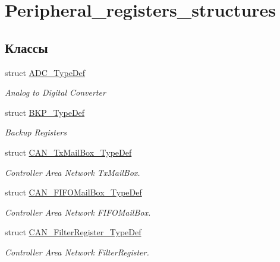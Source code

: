 \hypertarget{group___peripheral__registers__structures}{}\section{Peripheral\+\_\+registers\+\_\+structures}
\label{group___peripheral__registers__structures}
\subsection*{Классы}
\begin{DoxyCompactItemize}
\item 
struct \mbox{\hyperlink{struct_a_d_c___type_def}{A\+D\+C\+\_\+\+Type\+Def}}
\begin{DoxyCompactList}\small\item\em Analog to Digital Converter ~\newline
 \end{DoxyCompactList}\item 
struct \mbox{\hyperlink{struct_b_k_p___type_def}{B\+K\+P\+\_\+\+Type\+Def}}
\begin{DoxyCompactList}\small\item\em Backup Registers ~\newline
 \end{DoxyCompactList}\item 
struct \mbox{\hyperlink{struct_c_a_n___tx_mail_box___type_def}{C\+A\+N\+\_\+\+Tx\+Mail\+Box\+\_\+\+Type\+Def}}
\begin{DoxyCompactList}\small\item\em Controller Area Network Tx\+Mail\+Box. \end{DoxyCompactList}\item 
struct \mbox{\hyperlink{struct_c_a_n___f_i_f_o_mail_box___type_def}{C\+A\+N\+\_\+\+F\+I\+F\+O\+Mail\+Box\+\_\+\+Type\+Def}}
\begin{DoxyCompactList}\small\item\em Controller Area Network F\+I\+F\+O\+Mail\+Box. \end{DoxyCompactList}\item 
struct \mbox{\hyperlink{struct_c_a_n___filter_register___type_def}{C\+A\+N\+\_\+\+Filter\+Register\+\_\+\+Type\+Def}}
\begin{DoxyCompactList}\small\item\em Controller Area Network Filter\+Register. \end{DoxyCompactList}\item 

\end{DoxyCompactItemize}
